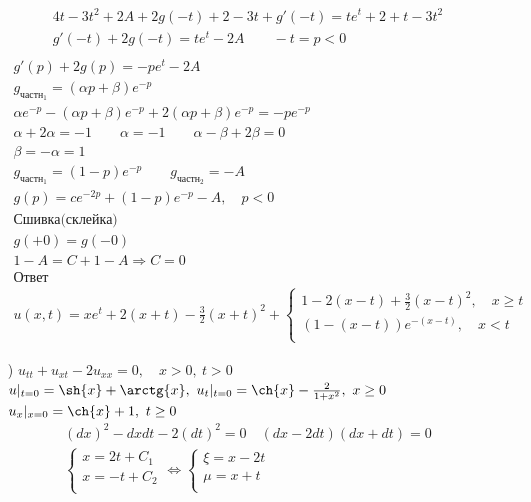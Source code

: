 \begin{enumerate}
\begin{gather*}
\begin{split}
\end{split} \\
4t-3t^{2}+2A+2g(-t)+2-3t+g'(-t) = te^{t}+2+t-3t^{2} \\
g'(-t)+2g(-t)=te^{t}-2A \qquad -t = p < 0 \\
\end{gather*}
\begin{gather*}
g'(p)+2g(p)=-pe^{t}-2A \\
  g_{\text{частн}_{1}} = (\alpha p + \beta ) e^{-p} \\
  \alpha e^{-p}- (\alpha p +\beta)e^{-p}+2(\alpha p + \beta)e^{-p} = -pe^{-p} \\
  \alpha +2\alpha = -1 \qquad \alpha = -1 \qquad \alpha - \beta +2 \beta = 0 \\
  \beta = -\alpha = 1 \\
  g_{\text{частн}_{1}} = (1-p)e^{-p} \qquad g_{\text{частн}_{2}}=-A \\
  g(p) = ce^{-2p}+(1-p)e^{-p}-A, \quad p < 0 \\
  \text{Сшивка(склейка)} \\
  g(+0)= g(-0) \\
  1-A=C+1-A \Rightarrow C = 0 \\
  \text{Ответ} \\
  \boxed{u(x,t)=xe^{t}+2(x+t)- \frac{3}{2}(x+t)^{2} +
  \begin{cases}
   1-2(x-t) + \frac{3}{2}(x-t)^{2}, \quad x \geq t \\
   (1-(x-t))e^{-(x-t)}, \quad x <t \\
\end{cases}}
\end{gather*}
\item[\text{г})] $u_{tt}+u_{xt}-2u_{xx}=0, \quad x >0, \ t>0$ \\
  $u|_{t=0}=\sh{x}+\arctg{x}, \ u_{t}|_{t=0}= \ch{x}- \frac{2}{1+x^{2}}, \ x \geq 0$ \\
  $u_{x}|_{x=0}=\ch{x}+1, \ t \geq 0$ \\
  \begin{gather*}
    (dx)^{2}-dxdt-2(dt)^{2}=0 \quad (dx-2dt)(dx+dt) = 0 \\
    \begin{cases}
     x = 2t + C_{1} \\ x = -t + C_{2} \\
    \end{cases} \Leftrightarrow
    \begin{cases}
     \xi = x-2t \\ \mu = x+t \\ 

\end{cases}
\end{gather*}
\end{enumerate}
